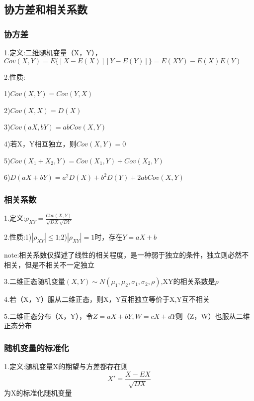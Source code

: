 \documentclass[11pt,twoside,a4paper]{ctexart}
\begin{document}
    \subsection{协方差和相关系数}

    \subsubsection{协方差}

    1.定义:二维随机变量（X，Y），$Cov(X,Y) = E\{[X - E(X)][Y - E(Y)]\} = E(XY) - E(X)E(Y)$

    2.性质:
    \begin{minipage}[t]{0.9\linewidth}
        1)$Cov(X,Y) = Cov(Y,X)$

        2)$Cov(X,X) = D(X)$

        3)$Cov(aX,bY) = abCov(X,Y)$

        4)若X，Y相互独立，则$Cov(X,Y) = 0$

        5)$Cov(X_1 + X_2 , Y) = Cov(X_1 , Y) + Cov(X_2 , Y)$

        6)$D(aX + bY) = a^2D(X) + b^2D(Y) + 2abCov(X,Y)$
        
    \end{minipage}

    \subsubsection{相关系数}

    1.定义:$\rho _{XY} = \frac{Cov(X,Y)}{\sqrt{DX} \sqrt{DY}}$

    2.性质:1)$|\rho _{XY}| \leq 1 $;2)$|\rho _{XY}| = 1$时，存在$Y = aX + b$

    note:相关系数仅描述了线性的相关程度，是一种弱于独立的条件，独立则必然不相关，但是不相关不一定独立

    3.二维正态随机变量$(X,Y)\sim N(\mu _1,\mu_2,\sigma _1,\sigma _2,\rho)$,XY的相关系数是$\rho $

    4.若（X，Y）服从二维正态，则X，Y互相独立等价于X,Y互不相关

    5.二维正态分布（X，Y），令$Z = aX + bY,W = cX + dY$则（Z，W）也服从二维正态分布

    \subsubsection{随机变量的标准化}
    
    1.定义:随机变量X的期望与方差都存在则
    \[X' = \frac{X - EX}{\sqrt{DX}}\]
    为X的标准化随机变量
\end{document}
